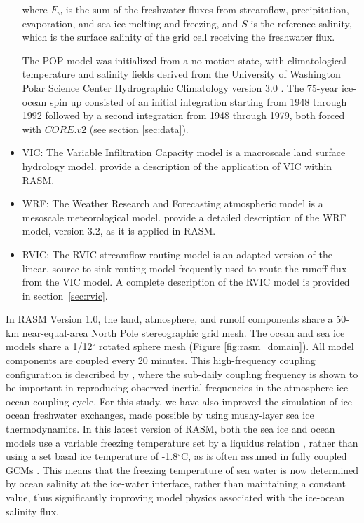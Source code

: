 \documentclass[jgrga, draft]{agutex}
\begin{document}
\begin{article}
\begin{itemize}[leftmargin=+.5in]
where $F_w$ is the sum of the freshwater fluxes from streamflow, precipitation, evaporation, and sea ice melting and freezing, and $S$ is the reference salinity, which is the surface salinity of the grid cell receiving the freshwater flux.

The POP model was initialized from a no-motion state, with climatological temperature and salinity fields derived from the University of Washington Polar Science Center Hydrographic Climatology version 3.0 \citep{Steele_2001}.
The 75-year ice-ocean spin up consisted of an initial integration starting from 1948 through 1992 followed by a second integration from 1948 through 1979, both forced with $CORE.v2$ (see section \ref{sec:data}).

\item VIC: The Variable Infiltration Capacity model \citep{Liang_1994} is a macroscale land surface hydrology model.
\citet{Hamman_2016} provide a description of the application of VIC within RASM.
\item WRF: The Weather Research and Forecasting atmospheric model \citep{Skamarock_2007} is a mesoscale meteorological model.
\citet{Cassano_2016} provide a detailed description of the WRF model, version 3.2, as it is applied in RASM.
\item RVIC: The RVIC streamflow routing model is an adapted version of the \citet{Lohmann_1996} linear, source-to-sink routing model frequently used to route the runoff flux from the VIC model.
A complete description of the RVIC model is provided in section~\ref{sec:rvic}.
\end{itemize}

In RASM Version 1.0, the land, atmosphere, and runoff components share a 50-km near-equal-area North Pole stereographic grid mesh.
The ocean and sea ice models share a 1/12$^{\circ}$ rotated sphere mesh (Figure \ref{fig:rasm_domain}).
All model components are coupled every 20 minutes.
This high-frequency coupling configuration is described by \citet{Roberts_2015a}, where the sub-daily coupling frequency is shown to be important in reproducing observed inertial frequencies in the atmosphere-ice-ocean coupling cycle.
For this study, we have also improved the simulation of ice-ocean freshwater exchanges, made possible by using mushy-layer sea ice thermodynamics.
In this latest version of RASM, both the sea ice and ocean models use a variable freezing temperature set by a liquidus relation \citep{Turner2015}, rather than using a set basal ice temperature of -1.8$^\circ$C, as is often assumed in fully coupled GCMs \citep [e.g.,][]{Jahn2012a}.
This means that the freezing temperature of sea water is now determined by ocean salinity at the ice-water interface, rather than maintaining a constant value, thus significantly improving model physics associated with the ice-ocean salinity flux.


\end{article}
\end{document}
